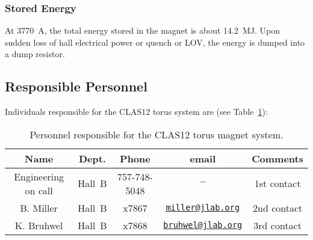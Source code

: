 \subsubsection{Stored Energy}

At 3770~A, the total energy stored in the magnet is about 14.2~MJ. Upon sudden loss of hall 
electrical power or quench or LOV, the energy is dumped into a dump resistor.

\subsection{Responsible Personnel}

Individuals responsible for the CLAS12 torus system are (see Table~\ref{tb:torus}):

\begin{table}[!htb]
\centering
\begin{tabular}{|c|c|c|c|c|} \hline
Name       & Dept.  & Phone&email&Comments \\ \hline
Engineering on call & Hall~B &757-748-5048&$-$& 1st contact \\ \hline
B. Miller  & Hall~B & x7867&\href{mailto:miller@jlab.org}{\nolinkurl{miller@jlab.org}}&2nd contact\\ \hline
K. Bruhwel & Hall~B & x7868&\href{mailto:}{\nolinkurl{bruhwel@jlab.org}}&3rd contact \\ \hline
\end{tabular}
\caption{Personnel responsible for the CLAS12 torus magnet system.} 
\label{tb:torus}
\end{table}

